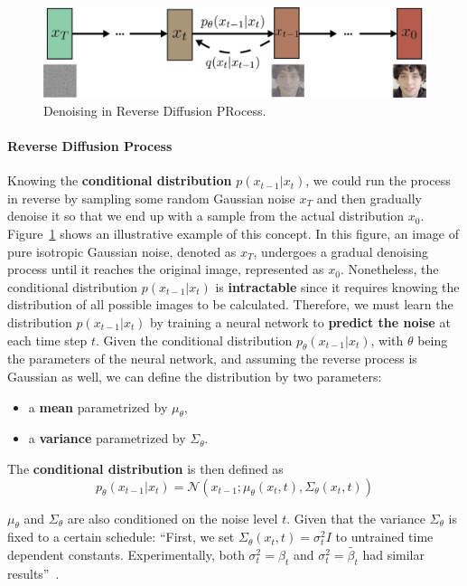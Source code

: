 \documentclass[preprint]{elsarticle}
\begin{document}
\begin{figure}[b]
	\centering
	\includegraphics[scale=0.74, keepaspectratio]{img/background_img/Diffusion2.png}
	\caption{Denoising in Reverse Diffusion PRocess.}\label{fig:m-chain}
\end{figure}


\paragraph{Reverse Diffusion Process} Knowing the \textbf{conditional distribution} $p(x_{t-1}|x_t)$, we could run the process in reverse by sampling some random Gaussian noise $x_T$ and then gradually denoise it so that we end up with a sample from the actual distribution $x_0$.
Figure~\ref{fig:m-chain} shows an illustrative example of this concept. In this figure, an image of pure isotropic Gaussian noise, denoted as $x_T$, undergoes a gradual denoising process until it reaches the original image, represented as $x_0$.
Nonetheless, the conditional distribution $p(x_{t-1}|x_t)$ is \textbf{intractable} since it requires knowing the distribution of all possible images to be calculated.
Therefore, we must learn the distribution $p(x_{t-1}|x_t)$ by training a neural network to \textbf{predict the noise} at each time step $t$. Given the conditional distribution $p_\theta(x_{t-1}|x_t)$, 
with $\theta$ being the parameters of the neural network, and assuming the reverse process is Gaussian as well, we can define the distribution by two parameters:

\begin{itemize}
	\item a \textbf{mean} parametrized by $\mu_\theta$,
	\item a \textbf{variance} parametrized by $\Sigma_\theta$.
\end{itemize}

The \textbf{conditional distribution} is then defined as
\begin{equation}
	p_\theta(x_{t-1}|x_t) = \mathcal{N}(x_{t-1}; \mu_\theta(x_t,t), \Sigma_\theta(x_t,t))
\end{equation}

$\mu_\theta$ and $\Sigma_\theta$ are also conditioned on the noise level $t$.
Given that the variance $\Sigma_\theta$ is fixed to a certain schedule: ``First, we set $\Sigma_\theta(x_t,t)=\sigma_t^2I$ to untrained time dependent constants. Experimentally, both $\sigma_t^2=\beta_t$ and $\sigma_t^2=\tilde{\beta_t}$ had similar results''~\cite{ho2020denoising}.
\end{document}
